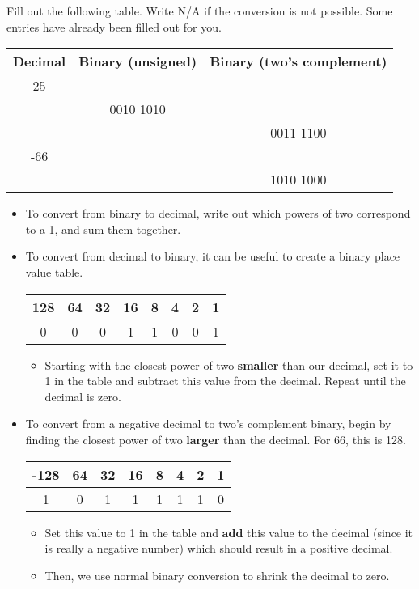 \begin{blocksection}
\question Fill out the following table. Write N/A if the conversion is not possible. Some entries have already been filled out for you.

\begin{center}
  \begin{tabular}{|c|c|c|}
    \hline
    Decimal & Binary (unsigned) & Binary (two's complement) \\
    \hline\hline
    25 &  &  \\
    \hline
    & 0010 1010 & \\
    \hline
    &  & 0011 1100 \\
    \hline
    -66 &  &  \\
    \hline
    &  & 1010 1000 \\
    \hline
  \end{tabular}
\end{center}

\begin{itemize}
  \item To convert from binary to decimal, write out which powers of two correspond to a 1, and sum them together.
  \item To convert from decimal to binary, it can be useful to create a binary place value table.
  \begin{center}
  \begin{tabular}{|c|c|c|c|c|c|c|c|}
    \hline
    128 & 64 & 32 & 16 & 8 & 4 & 2 & 1 \\
    \hline
    0 & 0 & 0 & 1 & 1 & 0 & 0 & 1 \\
    \hline
  \end{tabular}
  \end{center}
  \begin{itemize}
    \item Starting with the closest power of two \textbf{smaller} than our decimal, set it to 1 in the table and subtract this value from the decimal. Repeat until the decimal is zero.
  \end{itemize}
  \item To convert from a negative decimal to two's complement binary, begin by finding the closest power of two \textbf{larger} than the decimal. For 66, this is 128.
  \begin{center}
  \begin{tabular}{|c|c|c|c|c|c|c|c|}
    \hline
    -128 & 64 & 32 & 16 & 8 & 4 & 2 & 1 \\
    \hline
    1 & 0 & 1 & 1 & 1 & 1 & 1 & 0 \\
    \hline
  \end{tabular}
  \end{center}
  \begin{itemize}
    \item Set this value to 1 in the table and \textbf{add} this value to the decimal (since it is really a negative number) which should result in a positive decimal.
    \item Then, we use normal binary conversion to shrink the decimal to zero.
  \end{itemize}
\end{itemize}


\end{blocksection}

